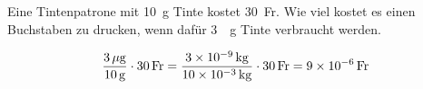 

\begin{aufgabe}
	Eine Tintenpatrone mit \SI{10}{g} Tinte kostet \SI{30}{Fr}. 
	Wie viel kostet es einen Buchstaben zu drucken, wenn dafür \SI{3}{\mu g} Tinte verbraucht werden.
	\begin{loesung}
		\begin{eqnarray*}
			\frac{\SI{3}{\mu g}}{\SI{10}{g}}\cdot\SI{30}{Fr}=\frac{\SI{3E-9}{kg}}{\SI{10E-3}{kg}}\cdot\SI{30}{Fr}=\SI{9E-6}{Fr}
		\end{eqnarray*}
	\end{loesung}
\end{aufgabe}
